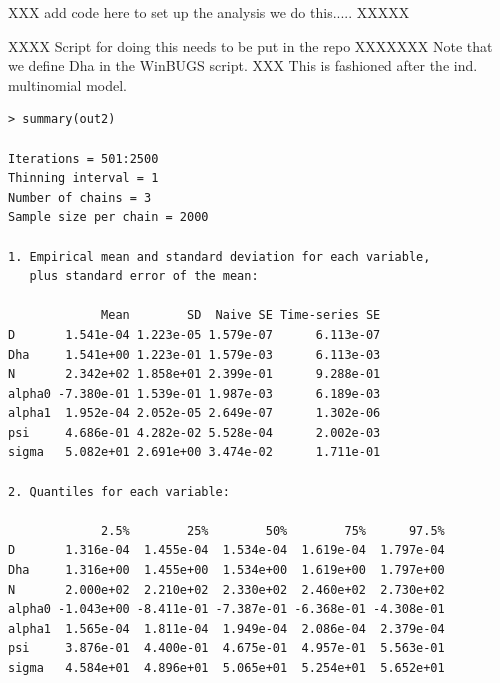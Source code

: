 XXX add code here 
to set up the analysis we do this.....
XXXXX

XXXX Script for doing this needs to be put in the repo XXXXXXX
Note that we define Dha in the WinBUGS script.
XXX This is fashioned after the ind. multinomial model.

{\small 
\begin{verbatim}
> summary(out2)

Iterations = 501:2500
Thinning interval = 1 
Number of chains = 3 
Sample size per chain = 2000 

1. Empirical mean and standard deviation for each variable,
   plus standard error of the mean:

             Mean        SD  Naive SE Time-series SE
D       1.541e-04 1.223e-05 1.579e-07      6.113e-07
Dha     1.541e+00 1.223e-01 1.579e-03      6.113e-03
N       2.342e+02 1.858e+01 2.399e-01      9.288e-01
alpha0 -7.380e-01 1.539e-01 1.987e-03      6.189e-03
alpha1  1.952e-04 2.052e-05 2.649e-07      1.302e-06
psi     4.686e-01 4.282e-02 5.528e-04      2.002e-03
sigma   5.082e+01 2.691e+00 3.474e-02      1.711e-01

2. Quantiles for each variable:

             2.5%        25%        50%        75%      97.5%
D       1.316e-04  1.455e-04  1.534e-04  1.619e-04  1.797e-04
Dha     1.316e+00  1.455e+00  1.534e+00  1.619e+00  1.797e+00
N       2.000e+02  2.210e+02  2.330e+02  2.460e+02  2.730e+02
alpha0 -1.043e+00 -8.411e-01 -7.387e-01 -6.368e-01 -4.308e-01
alpha1  1.565e-04  1.811e-04  1.949e-04  2.086e-04  2.379e-04
psi     3.876e-01  4.400e-01  4.675e-01  4.957e-01  5.563e-01
sigma   4.584e+01  4.896e+01  5.065e+01  5.254e+01  5.652e+01
\end{verbatim}
}

